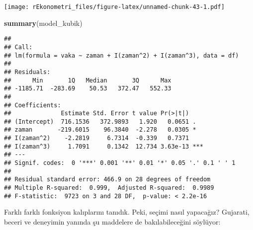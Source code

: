 \documentclass[
]{book}
\newenvironment{Shaded}{\begin{snugshade}}{\end{snugshade}}
\newcommand{\DataTypeTok}[1]{\textcolor[rgb]{0.13,0.29,0.53}{#1}}
\newcommand{\DecValTok}[1]{\textcolor[rgb]{0.00,0.00,0.81}{#1}}
\newcommand{\KeywordTok}[1]{\textcolor[rgb]{0.13,0.29,0.53}{\textbf{#1}}}
\newcommand{\NormalTok}[1]{#1}
\newcommand{\OperatorTok}[1]{\textcolor[rgb]{0.81,0.36,0.00}{\textbf{#1}}}
\newcommand{\StringTok}[1]{\textcolor[rgb]{0.31,0.60,0.02}{#1}}
\begin{document}
\begin{Shaded}
\end{Shaded}

\texttt{[image: rEkonometri\_files/figure-latex/unnamed-chunk-43-1.pdf]}

\begin{Shaded}
\begin{Highlighting}[]
\KeywordTok{summary}\NormalTok{(model_kubik)}
\end{Highlighting}
\end{Shaded}

\begin{verbatim}
## 
## Call:
## lm(formula = vaka ~ zaman + I(zaman^2) + I(zaman^3), data = df)
## 
## Residuals:
##      Min       1Q   Median       3Q      Max 
## -1185.71  -283.69    50.53   372.47   552.33 
## 
## Coefficients:
##              Estimate Std. Error t value Pr(>|t|)    
## (Intercept)  716.1536   372.9893   1.920   0.0651 .  
## zaman       -219.6015    96.3840  -2.278   0.0305 *  
## I(zaman^2)    -2.2819     6.7314  -0.339   0.7371    
## I(zaman^3)     1.7091     0.1342  12.734 3.63e-13 ***
## ---
## Signif. codes:  0 '***' 0.001 '**' 0.01 '*' 0.05 '.' 0.1 ' ' 1
## 
## Residual standard error: 466.9 on 28 degrees of freedom
## Multiple R-squared:  0.999,  Adjusted R-squared:  0.9989 
## F-statistic:  9723 on 3 and 28 DF,  p-value: < 2.2e-16
\end{verbatim}

Farklı farklı fonksiyon kalıplarını tanıdık. Peki, seçimi nasıl yapacağız? Gujarati, beceri ve deneyimin yanında şu maddelere de bakılabileceğini söylüyor:
\end{document}
